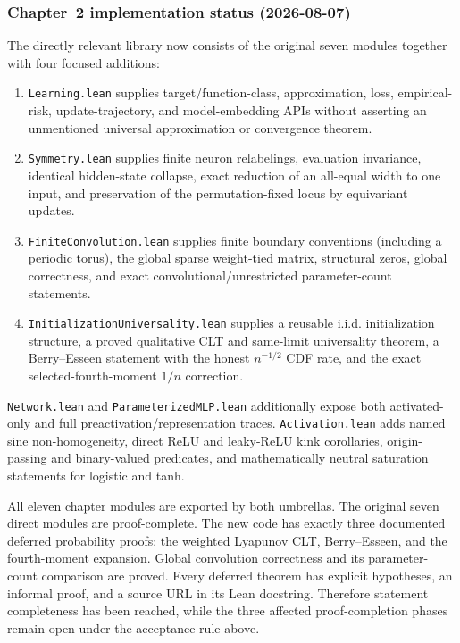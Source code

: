 \subsubsection*{Chapter~2 implementation status (2026-08-07)}
The directly relevant library now consists of the original seven modules together with four
focused additions:
\begin{enumerate}
  \item \texttt{Learning.lean} supplies target/function-class, approximation, loss, empirical-risk,
    update-trajectory, and model-embedding APIs without asserting an unmentioned universal
    approximation or convergence theorem.
  \item \texttt{Symmetry.lean} supplies finite neuron relabelings, evaluation invariance, identical
    hidden-state collapse, exact reduction of an all-equal width to one input, and preservation of
    the permutation-fixed locus by equivariant updates.
  \item \texttt{FiniteConvolution.lean} supplies finite boundary conventions (including a periodic
    torus), the global sparse weight-tied matrix, structural zeros, global correctness, and exact
    convolutional/unrestricted parameter-count statements.
  \item \texttt{InitializationUniversality.lean} supplies a reusable i.i.d. initialization
    structure, a proved qualitative CLT and same-limit universality theorem, a Berry--Esseen
    statement with the honest $n^{-1/2}$ CDF rate, and the exact selected-fourth-moment $1/n$
    correction.
\end{enumerate}
\texttt{Network.lean} and \texttt{ParameterizedMLP.lean} additionally expose both activated-only
and full preactivation/representation traces.  \texttt{Activation.lean} adds named sine
non-homogeneity, direct ReLU and leaky-ReLU kink corollaries, origin-passing and binary-valued
predicates, and mathematically neutral saturation statements for logistic and tanh.

All eleven chapter modules are exported by both umbrellas.  The original seven direct modules are
proof-complete.  The new code has exactly three documented deferred probability proofs: the
weighted Lyapunov CLT, Berry--Esseen, and the fourth-moment expansion.  Global convolution
correctness and its parameter-count comparison are proved.  Every deferred theorem has explicit
hypotheses, an informal proof, and a source URL in its Lean docstring.  Therefore statement
completeness has been reached, while the three affected proof-completion phases remain open under
the acceptance rule above.

